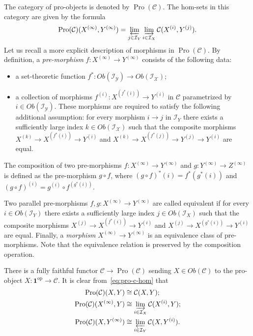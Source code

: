 \documentclass[oneside, 11pt]{amsart}
\numberwithin{equation}{section}
\theoremstyle{definition}
\theoremstyle{remark}
\DeclareMathOperator{\Pro}{Pro}
\newcommand{\op}{\mathrm{op}}
\begin{document}
The category of pro-objects is denoted by \(\Pro(\mathcal C)\). The hom-sets in this category are given by the formula
\begin{equation} \label{eq:pro-c-hom} \Pro(\mathcal C)(X^{(\infty)}, Y^{(\infty)}) = \varprojlim_{j \in \mathcal I_Y} \varinjlim_{i \in \mathcal I_X} \mathcal C(X^{(i)}, Y^{(j)}). \end{equation}
Let us recall a more explicit description of morphisms in \(\Pro(\mathcal C)\). 
By definition, a {\it pre-morphism} \(f \colon X^{(\infty)} \to Y^{(\infty)}\) consists of the following data:
\begin{itemize}
\item a set-theoretic function \(f^* \colon Ob(\mathcal{I_Y}) \to Ob(\mathcal{I_X})\);
\item a collection of morphisms \(f^{(i)} \colon X^{(f^*(i))} \to Y^{(i)}\) in $\mathcal{C}$ parametrized by $i \in Ob(\mathcal{I_Y})$. These morphisms are required to satisfy the following additional assumption: for every morphism \(i \to j\) in \(\mathcal I_Y\) there exists a sufficiently large index \(k \in Ob(\mathcal{I_X})\) such that the composite morphisms \(X^{(k)} \to X^{(f^*(i))} \to Y^{(i)}\) and \(X^{(k)} \to X^{(f^*(j))} \to Y^{(j)} \to Y^{(i)}\) are equal. \end{itemize}
The composition of two pre-morphisms \(f \colon X^{(\infty)} \to Y^{(\infty)}\) and \(g \colon Y^{(\infty)} \to Z^{(\infty)}\) is defined as the pre-morphism \(g \circ f\), where \((g \circ f)^*(i) = f^*(g^*(i))\) and \((g \circ f)^{(i)} = g^{(i)} \circ f^{(g^*(i))}\).

Two parallel pre-morphisms \(f, g \colon X^{(\infty)} \to Y^{(\infty)}\) are called equivalent if for every \(i \in Ob(\mathcal I_Y)\) there exists a sufficiently large index \(j \in Ob(\mathcal I_X)\) such that the composite morphisms \(X^{(j)} \to X^{(f^*(i))} \to Y^{(i)}\) and \(X^{(j)} \to X^{(g^*(i))} \to Y^{(i)}\) are equal. Finally, a {\it morphism} \(X^{(\infty)} \to Y^{(\infty)}\) is an equivalence class of pre-morphisms. Note that the equivalence relation is preserved by the composition operation.

There is a fully faithful functor $\mathcal{C} \to \Pro(\mathcal{C})$ sending \(X \in Ob(\mathcal C)\) to the pro-object $X \colon \mathbf{1}^\op \to \mathcal{C}$. It is clear from~\eqref{eq:pro-c-hom}  that
\begin{align}
 \Pro(\mathcal C)(X, Y) &\cong \mathcal C(X, Y);\\
 \Pro(\mathcal C)(X^{(\infty)}, Y) &\cong \varinjlim_{i \in \mathcal I_X} \mathcal C(X^{(i)}, Y); \label{eq:pro-c-hom-2}\\
 \Pro(\mathcal C)(X, Y^{(\infty)}) &\cong \varprojlim_{i \in \mathcal I_Y} \mathcal C(X, Y^{(i)}).
\end{align}
\end{document}

